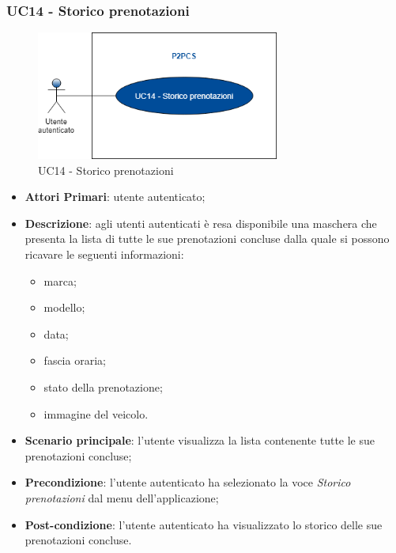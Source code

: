 \subsubsection{UC14 - Storico prenotazioni}
 \begin{figure}[h]
	\includegraphics[width=8cm]{res/images/Schemagenerale4.png}
	\centering
	\caption{UC14 - Storico prenotazioni}
\end{figure}
\begin{itemize}
	\item \textbf{Attori Primari}: utente autenticato;
	\item \textbf{Descrizione}: agli utenti autenticati è resa disponibile una maschera che presenta la lista di tutte le sue prenotazioni concluse dalla quale si possono ricavare le seguenti informazioni:
	\begin{itemize}
		\item marca;
		\item modello;
		\item data;
		\item fascia oraria;
		\item stato della prenotazione;
		\item immagine del veicolo.
	\end{itemize} 
	\item \textbf{Scenario principale}: l'utente visualizza la lista contenente tutte le sue prenotazioni concluse;
	\item \textbf{Precondizione}: l'utente autenticato ha selezionato la voce \textit{Storico prenotazioni} dal menu dell'applicazione;
	\item \textbf{Post-condizione}: l'utente autenticato ha visualizzato lo storico delle sue prenotazioni concluse. 
\end{itemize} 
